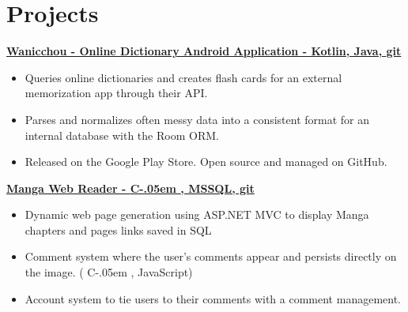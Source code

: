 \documentclass[letterpaper,11pt]{article}
\newcommand{\resumeItem}[2]{
    \vspace{-2pt}
    \item\small{
        \textbf{#1}{ #2 \vspace{-2pt}}
    }
}
\newcommand{\resumeItemListStart}{\begin{itemize}}
\newcommand{\resumeItemListEnd}{\end{itemize}}
\newcommand{\Csharp}{%
  {\settoheight{\dimen0}{C}C\kern-.05em \resizebox{!}{\dimen0}{\raisebox{\depth}{\#}}}}
\begin{document}
\section{\textbf{Projects}}
    \small{\textbf{
        \href {
            https://github.com/Limegrass/Wanicchou
        } {
            Wanicchou - Online Dictionary Android Application
            - Kotlin, Java, git
        }}}
    \resumeItemListStart
        \resumeItem{}
            {
                Queries online dictionaries and creates flash cards for
                an external memorization app through their API.
            }
        \resumeItem{}
            {
                Parses and normalizes often messy data into a 
                consistent format for an internal database
                with the Room ORM.
            }
        \resumeItem{}
            {
                Released on the Google Play Store.
                Open source and managed on GitHub.
            }
    \resumeItemListEnd
    \small{\textbf{
        \href{
            https://waifusims.com/Manga/Hakoiri
        }{
            Manga Web Reader
            - \Csharp, MSSQL, git
        }}}
    \resumeItemListStart
        \resumeItem{}
            {
                Dynamic web page generation using ASP.NET MVC to display Manga chapters and pages links saved in SQL
            }
        \resumeItem{}
            {
                Comment system where the user's comments appear and persists directly on the image. (\Csharp, JavaScript)
            }
        \resumeItem{}
            {
                Account system to tie users to their comments with a comment management.
            }
    \resumeItemListEnd
\end{document}

